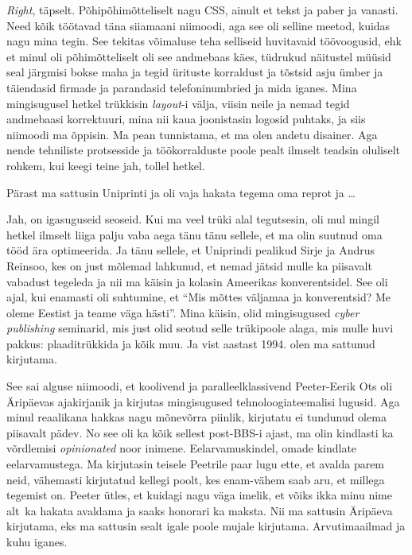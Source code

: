 \emph{Right}, täpselt. Põhipõhimõtteliselt nagu CSS, ainult et tekst ja paber ja vanasti. Need kõik töötavad täna siiamaani niimoodi, aga see oli selline meetod, kuidas nagu mina tegin. See  tekitas võimaluse teha selliseid huvitavaid töövoogusid, ehk et minul oli põhimõtteliselt  oli see andmebaas käes, tüdrukud näitustel müüsid seal järgmisi bokse maha ja tegid ürituste korraldust ja tõstsid asju ümber ja täiendasid firmade ja parandasid telefoninumbried ja mida iganes. Mina mingisugusel hetkel trükkisin \emph{layout}-i välja, viisin neile ja nemad tegid andmebaasi korrektuuri, mina nii kaua joonistasin logosid puhtaks, ja siis niimoodi ma õppisin. Ma pean tunnistama, et ma olen andetu disainer. Aga nende tehniliste protsesside ja töökorralduste poole pealt ilmselt teadsin oluliselt rohkem, kui keegi teine jah, tollel hetkel. 

Pärast ma sattusin Uniprinti ja oli vaja hakata tegema oma reprot ja \ldots


Jah, on igasuguseid seoseid. Kui ma veel trüki alal tegutsesin, oli mul mingil hetkel ilmselt liiga palju vaba aega tänu tänu sellele, et ma olin suutnud oma tööd ära optimeerida. Ja tänu sellele, et Uniprindi pealikud Sirje ja Andrus Reinsoo, kes on just mõlemad lahkunud, et nemad jätsid mulle ka piisavalt vabadust tegeleda ja nii ma käisin ja kolasin Ameerikas konverentsidel. See oli ajal, kui enamasti oli suhtumine, et \enquote{Mis mõttes väljamaa ja konverentsid? Me oleme Eestist ja teame väga hästi}. Mina käisin, olid mingisugused \emph{cyber publishing} seminarid, mis just olid seotud selle trükipoole alaga, mis mulle huvi pakkus: plaaditrükkida ja kõik muu. Ja vist aastast 1994. olen ma sattunud  kirjutama.

See sai alguse niimoodi, et koolivend ja paralleelklassivend Peeter-Eerik Ots oli Äripäevas ajakirjanik ja kirjutas mingisugused tehnoloogiateemalisi lugusid. Aga minul reaalikana hakkas nagu mõnevõrra piinlik, kirjutatu ei tundunud olema piisavalt pädev. No see oli ka kõik sellest post-BBS-i ajast, ma olin kindlasti ka võrdlemisi \emph{opinionated} noor inimene. Eelarvamuskindel,  omade kindlate eelarvamustega. Ma kirjutasin teisele Peetrile paar lugu ette, et avalda parem neid, vähemasti  kirjutatud kellegi poolt, kes enam-vähem saab aru, et millega tegemist on. Peeter ütles, et kuidagi nagu väga imelik, et võiks ikka minu nime alt ka hakata avaldama ja saaks honorari ka maksta. Nii ma sattusin Äripäeva kirjutama, eks ma sattusin sealt igale poole mujale kirjutama. Arvutimaailmad ja kuhu iganes. 

